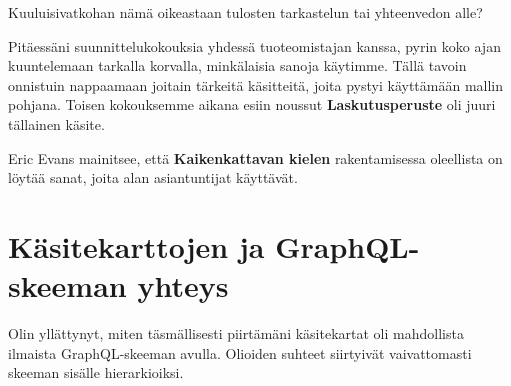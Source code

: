 Kuuluisivatkohan nämä oikeastaan tulosten tarkastelun tai yhteenvedon
alle?

Pitäessäni suunnittelukokouksia yhdessä tuoteomistajan kanssa, pyrin
koko ajan kuuntelemaan tarkalla korvalla, minkälaisia sanoja käytimme.
Tällä tavoin onnistuin nappaamaan joitain tärkeitä käsitteitä, joita
pystyi käyttämään mallin pohjana. Toisen kokouksemme aikana esiin
noussut \textbf{Laskutusperuste} oli juuri tällainen käsite.

Eric Evans mainitsee, että \textbf{Kaikenkattavan kielen} rakentamisessa
oleellista on löytää sanat, joita alan asiantuntijat käyttävät.

\hypertarget{kuxe4sitekarttojen-ja-graphql-skeeman-yhteys}{%
\section{Käsitekarttojen ja GraphQL-skeeman
yhteys}\label{kuxe4sitekarttojen-ja-graphql-skeeman-yhteys}}

Olin yllättynyt, miten täsmällisesti piirtämäni käsitekartat oli
mahdollista ilmaista GraphQL-skeeman avulla. Olioiden suhteet siirtyivät
vaivattomasti skeeman sisälle hierarkioiksi.
